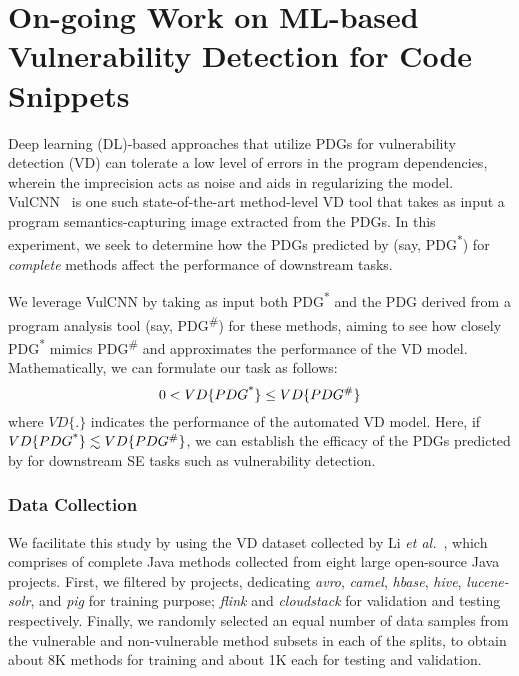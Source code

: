 \section{On-going Work on ML-based Vulnerability Detection for Code Snippets}
\label{sec:vd}




Deep learning (DL)-based approaches that utilize PDGs for
vulnerability detection (VD) can tolerate a low level of errors in the
program dependencies, wherein the imprecision acts as noise and aids
in regularizing the model. VulCNN~\cite{wu2022vulcnn} is one such
state-of-the-art method-level VD tool that takes as input a program
semantics-capturing image extracted from the PDGs. In this experiment,
we seek to determine how the PDGs predicted by \tool (say,
PDG\textsuperscript{*}) for {\em complete} methods affect the
performance of downstream tasks.


We leverage VulCNN by taking as input both PDG\textsuperscript{*} and
the PDG derived from a program analysis tool (say,
PDG\textsuperscript{\#}) for these methods, aiming to see how closely
PDG\textsuperscript{*} mimics PDG\textsuperscript{\#} and approximates
the performance of the VD model. Mathematically, we can formulate our
task as follows:
\begin{equation}
    \centering
    0 < VD\{PDG\textsuperscript{*}\} \leq VD\{PDG\textsuperscript{\#}\}
\end{equation}
where $VD\{.\}$ indicates the performance of the automated VD model. Here, if $VD\{PDG\textsuperscript{*}\} \lesssim VD\{PDG\textsuperscript{\#}\}$, we can establish the efficacy of the PDGs predicted by \tool for downstream SE tasks such as vulnerability detection.


\subsubsection*{\bf Data Collection}
We facilitate this study by using the VD dataset collected by Li {\em
  et al.}~\cite{yioopsla19}, which comprises of
complete Java methods collected from eight large
open-source Java projects. First, we filtered by projects, dedicating
\textit{avro}, \textit{camel}, \textit{hbase}, \textit{hive},
\textit{lucene-solr}, and \textit{pig} for training purpose;
\textit{flink} and \textit{cloudstack} for validation and testing
respectively.
Finally, we randomly selected an equal number of data samples from the
vulnerable and non-vulnerable method subsets in each of the splits, to
obtain about 8K methods for training and about 1K each for testing and
validation.


